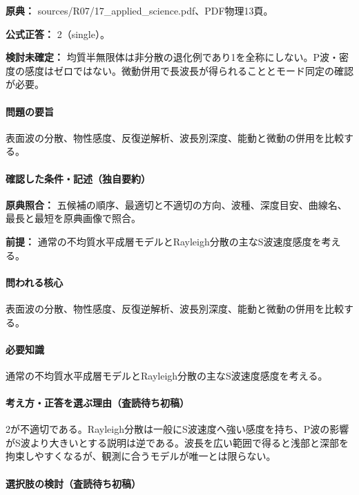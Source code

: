 \noindent\textbf{原典：} sources/R07/17\_applied\_science.pdf、PDF物理13頁。

\textbf{公式正答：} 2（single）。

\par\textbf{検討未確定：} 均質半無限体は非分散の退化例であり1を全称にしない。P波・密度の感度はゼロではない。微動併用で長波長が得られることとモード同定の確認が必要。

\paragraph{問題の要旨} 表面波の分散、物性感度、反復逆解析、波長別深度、能動と微動の併用を比較する。

\paragraph{確認した条件・記述（独自要約）}\mbox{}\par

\noindent\textbf{原典照合：} 五候補の順序、最適切と不適切の方向、波種、深度目安、曲線名、最長と最短を原典画像で照合。\par

\noindent\textbf{前提：} 通常の不均質水平成層モデルとRayleigh分散の主なS波速度感度を考える。\par

\paragraph{問われる核心} 表面波の分散、物性感度、反復逆解析、波長別深度、能動と微動の併用を比較する。

\paragraph{必要知識} 通常の不均質水平成層モデルとRayleigh分散の主なS波速度感度を考える。

\paragraph{考え方・正答を選ぶ理由（査読待ち初稿）} 2が不適切である。Rayleigh分散は一般にS波速度へ強い感度を持ち、P波の影響がS波より大きいとする説明は逆である。波長を広い範囲で得ると浅部と深部を拘束しやすくなるが、観測に合うモデルが唯一とは限らない。

\paragraph{選択肢の検討（査読待ち初稿）}\mbox{}\par


